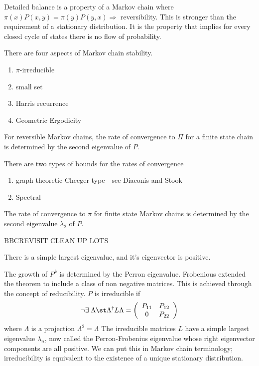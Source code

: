 Detailed balance is a property of a Markov chain where $\pi(x) P(x,y) =\pi(y) P(y,x) \Rightarrow$ reversibility.  This is stronger than the requirement of a stationary distribution.  It is the property that implies for every closed cycle of states there is no flow of probability.

There are four aspects of Markov chain stability.
\begin{enumerate}
\item $\pi$-irreducible
\item small set
\item Harris recurrence
\item Geometric Ergodicity
\end{enumerate}

For reversible Markov chains, the rate of convergence to $\Pi$ for a finite state chain is determined by the second eigenvalue of $P$.

There are two types of bounds for the rates of convergence
\begin{enumerate}
\item graph theoretic Cheeger type - see Diaconis and Stook
\item Spectral
\end{enumerate}
The rate of convergence to $\pi$ for finite state Markov chains is determined by the second eigenvalue $\lambda_2$ of $P$.

BBCREVISIT CLEAN UP LOTS
\begin{thm}
There is a simple largest eigenvalue, and it's eigenvector is positive.

\end{thm}
The growth of $P^k$ is determined by the Perron eigenvalue.  Frobenious extended the theorem to include a class of non negative matrices.  This is achieved through the concept of reducibility.  $P$ is irreducible if
\begin{equation*}
\neg \exists \; \Lambda \st\Lambda^\dag L \Lambda =
 \left( \begin{array}{cc}
P_{11} & P_{12}  \\
0 & P_{22} \end{array} \right)
\end{equation*}
where $\Lambda$ is a projection $\Lambda^2 = \Lambda$
The irreducible matrices $L$ have a simple largest eigenvalue $\lambda_n$, now called the Perron-Frobenius eigenvalue whose right eigenvector components are all positive.  We can put this in Markov chain terminology; irreducibility is equivalent to the existence of a unique stationary distribution.

